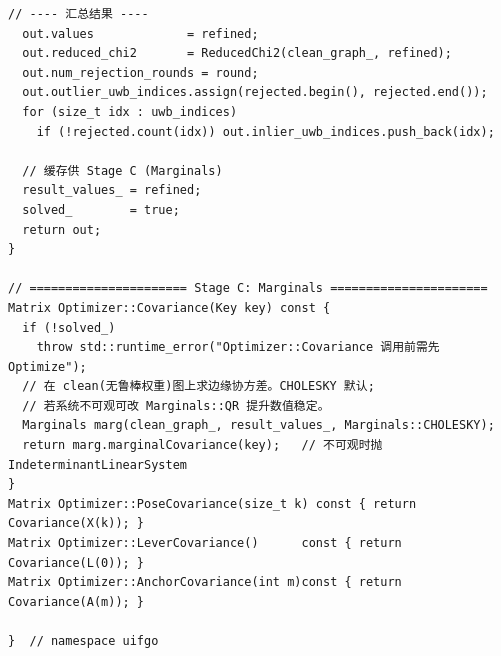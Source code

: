 \documentclass[11pt,a4paper]{report}
\begin{document}
\begin{lstlisting}[style=cpp]
  // ---- 汇总结果 ----
  out.values             = refined;
  out.reduced_chi2       = ReducedChi2(clean_graph_, refined);
  out.num_rejection_rounds = round;
  out.outlier_uwb_indices.assign(rejected.begin(), rejected.end());
  for (size_t idx : uwb_indices)
    if (!rejected.count(idx)) out.inlier_uwb_indices.push_back(idx);

  // 缓存供 Stage C (Marginals)
  result_values_ = refined;
  solved_        = true;
  return out;
}

// ====================== Stage C: Marginals ======================
Matrix Optimizer::Covariance(Key key) const {
  if (!solved_)
    throw std::runtime_error("Optimizer::Covariance 调用前需先 Optimize");
  // 在 clean(无鲁棒权重)图上求边缘协方差。CHOLESKY 默认;
  // 若系统不可观可改 Marginals::QR 提升数值稳定。
  Marginals marg(clean_graph_, result_values_, Marginals::CHOLESKY);
  return marg.marginalCovariance(key);   // 不可观时抛 IndeterminantLinearSystem
}
Matrix Optimizer::PoseCovariance(size_t k) const { return Covariance(X(k)); }
Matrix Optimizer::LeverCovariance()      const { return Covariance(L(0)); }
Matrix Optimizer::AnchorCovariance(int m)const { return Covariance(A(m)); }

}  // namespace uifgo
\end{lstlisting}
\end{document}
